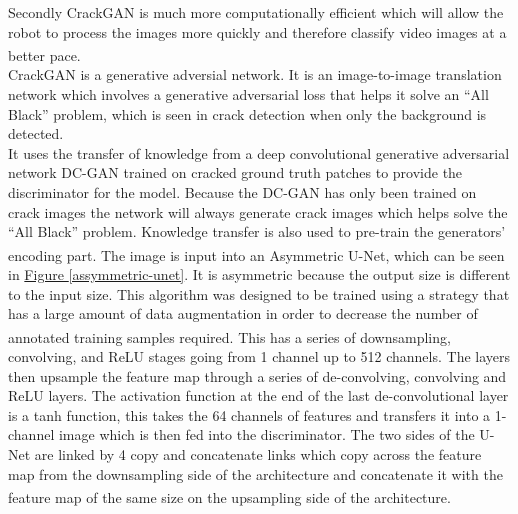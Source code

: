\documentclass[11pt]{article}		%
\newcommand{\supercite}[1]{\textsuperscript{\cite{#1}}}		%
\newcommand{\figref}[1]{\hyperref[#1]{Figure \ref*{#1}}}    %
\begin{document}
	        Secondly CrackGAN is much more computationally efficient which will allow the robot to process the images more quickly and therefore classify video images at a better pace.\supercite{CrackGAN1}
			\\
			CrackGAN is a generative adversial network. 
			It is an image-to-image translation network which involves a generative adversarial loss that helps it solve an “All Black” problem, which is seen in crack detection when only the background is detected.
			\\
			It uses the transfer of knowledge from a deep convolutional generative adversarial network {DC-GAN} trained on cracked ground truth patches to provide the discriminator for the model. Because the DC-GAN has only been trained on crack images the network will always generate crack images which helps solve the “All Black” problem. Knowledge transfer is also used to pre-train the generators’ encoding part.\supercite{CrackGAN1} 
	        The image is input into an Asymmetric U-Net, which can be seen in \figref{assymmetric-unet}. It is asymmetric because the output size is different to the input size. This algorithm was designed to be trained using a strategy that has a large amount of data augmentation in order to decrease the number of annotated training samples required.\supercite{U-Net} This has a series of downsampling, convolving, and ReLU stages going from 1 channel up to 512 channels. The layers then upsample the feature map through a series of de-convolving, convolving and ReLU layers. The activation function at the end of the last de-convolutional layer is a tanh function, this takes the 64 channels of features and transfers it into a 1-channel image which is then fed into the discriminator. The two sides of the U-Net are linked by 4 copy and concatenate links which copy across the feature map from the downsampling side of the architecture and concatenate it with the feature map of the same size on the upsampling side of the architecture.\supercite{U-Net}
	        \\
	        
\end{document}
